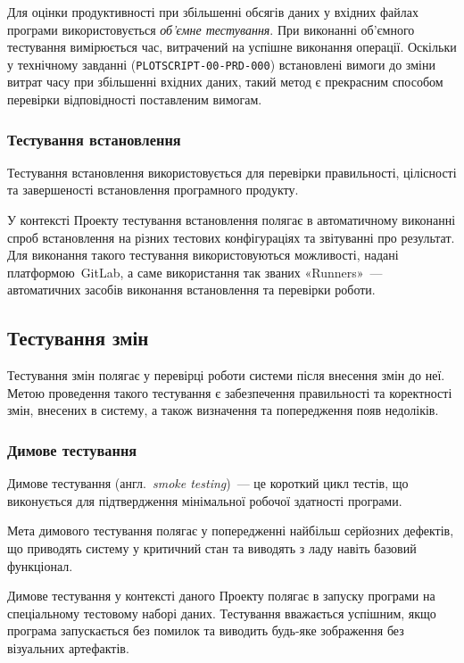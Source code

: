 \documentclass[a4paper,oneside,DIV=12,12pt]{scrartcl}
\newcommand{\theprdcode}{PLOTSCRIPT-00-PRD-000}
\newcommand{\printprdcode}{\texttt{\theprdcode}}
\newcommand{\langdef}[2]{{#1}.~\textit{#2}}
\begin{document}
				Для оцінки продуктивності при збільшенні обсягів даних у вхідних файлах програми використовується \emph{об'ємне тестування}. При виконанні об'ємного тестування вимірюється час, витрачений на успішне виконання операції. Оскільки у технічному завданні (\printprdcode) встановлені вимоги до зміни витрат часу при збільшенні вхідних даних, такий метод є прекрасним способом перевірки відповідності поставленим вимогам.
				
			\subsubsection{Тестування встановлення}
				Тестування встановлення використовується для перевірки правильності, цілісності та завершеності встановлення програмного продукту.
				
				У контексті Проекту тестування встановлення полягає в автоматичному виконанні спроб встановлення на різних тестових конфігураціях та звітуванні про результат. Для виконання такого тестування використовуються можливості, надані платформою~GitLab, а саме використання так званих «Runners»~— автоматичних засобів виконання встановлення та перевірки роботи.
				
		\subsection{Тестування змін}
			Тестування змін полягає у перевірці роботи системи після внесення змін до неї. Метою проведення такого тестування є забезпечення правильності та коректності змін, внесених в систему, а також визначення та попередження появ недоліків.
			
			\subsubsection{Димове тестування}
				Димове тестування (\langdef{англ}{smoke testing})~— це короткий цикл тестів, що виконується для підтвердження мінімальної робочої здатності програми.
				
				Мета димового тестування полягає у попередженні найбільш серйозних дефектів, що приводять систему у критичний стан та виводять з ладу навіть базовий функціонал.
				
				Димове тестування у контексті даного Проекту полягає в запуску програми на спеціальному тестовому наборі даних. Тестування вважається успішним, якщо програма запускається без помилок та виводить будь-яке зображення без візуальних артефактів.
				
\end{document}
